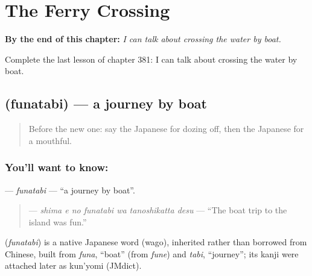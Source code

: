 
\chapter{The Ferry Crossing}
\label{ch:ja-the-ferry-crossing}

\begin{chapteropening}
\textbf{By the end of this chapter:} \emph{I can talk about crossing the water by boat.}

Complete the last lesson of chapter 381: I can talk about crossing the water by boat.
\end{chapteropening}

\section[\texorpdfstring{\ja{ふなたび} (funatabi)}{ふなたび (funatabi)}]{ (funatabi) — a journey by boat}

\label{lesson:JA-C381-funatabi}



\begin{quote}
Before the new one: say the Japanese for dozing off, then the Japanese for a mouthful.
\end{quote}

\subsection*{You'll want to know: }
\textbf{} — \emph{funatabi} — \textquotedblleft{}a journey by boat\textquotedblright{}.

\begin{quote}
\textbf{  } — \emph{shima e no funatabi wa tanoshikatta desu} — \textquotedblleft{}The boat trip to the island was fun.\textquotedblright{}
\end{quote}

\begin{cousinweb}
\textbf{} (\emph{funatabi}) is a native Japanese word (wago), inherited rather than borrowed from Chinese, built from \emph{funa}, \textquotedblleft{}boat\textquotedblright{} (from \emph{fune}) and \emph{tabi}, \textquotedblleft{}journey\textquotedblright{}; its kanji were attached later as kun'yomi (JMdict).
\end{cousinweb}

